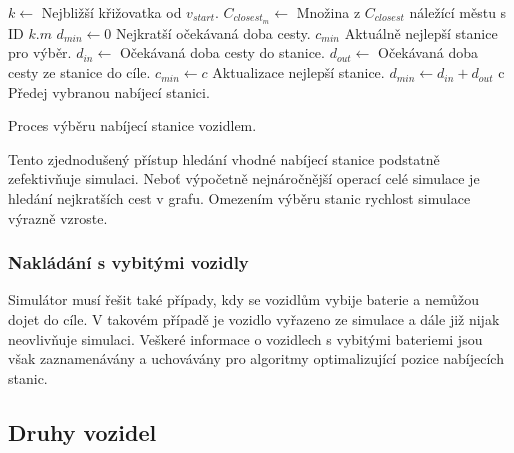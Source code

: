 \begin{algorithm}
\begin{algorithmic}
    \State $k \gets$ Nejbližší křižovatka od $v_{start}$.
    \State $C_{closest_m} \gets$ Množina z $C_{closest}$ náležící městu s ID $k.m$
    \State $d_{min} \gets 0$ \Comment Nejkratší očekávaná doba cesty.
    \State $c_{min}$ \Comment Aktuálně nejlepší stanice pro výběr. 
        \State $d_{in} \gets$  
            \Comment Očekávaná doba cesty do stanice.
        \State $d_{out} \gets$ 
            \Comment Očekávaná doba cesty ze stanice do cíle.
            \State $c_{min} \gets c$ \Comment Aktualizace nejlepší stanice.
            \State $d_{min} \gets d_{in} + d_{out}$
        \EndIf
    \EndFor
    \State \Return c \Comment Předej vybranou nabíjecí stanici.
\EndFunction
\end{algorithmic}
\caption{Proces výběru nabíjecí stanice vozidlem.}
\label{alg:vyber_stanice}
\end{algorithm}

Tento zjednodušený přístup hledání vhodné nabíjecí stanice podstatně zefektivňuje
simulaci. Neboť výpočetně nejnáročnější operací celé simulace je hledání nejkratších
cest v grafu. Omezením výběru stanic rychlost simulace výrazně vzroste. 


\subsubsection{Nakládání s vybitými vozidly}

Simulátor musí řešit také případy, kdy se vozidlům vybije baterie a nemůžou 
dojet do cíle. V takovém případě je vozidlo vyřazeno ze simulace a dále již nijak
neovlivňuje simulaci. Veškeré informace o vozidlech s vybitými bateriemi jsou
však zaznamenávány a uchovávány pro algoritmy optimalizující pozice 
nabíjecích stanic.

\subsection{Druhy vozidel}
\label{subsec:druhy_vozidel}

